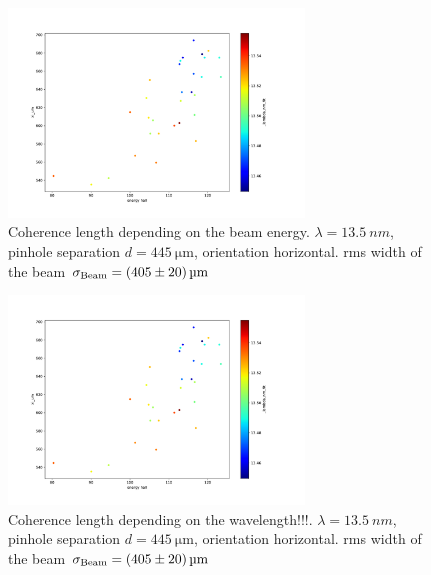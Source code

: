 \documentclass{osa-article}
\begin{document}
\begin{figure}[htbp]
    \centering
    \includegraphics[width=0.7\textwidth]{gfx/13p5nm_S_445um/xi_um_vs_energy_hall_FLASH2_USER1-2017-11-29T1007.pdf}
    \caption{Coherence length depending on the beam energy. $\lambda=\SI{13.5}{nm}$, pinhole separation $d=\SI{445}{\micro\meter}$, orientation horizontal. rms width of the beam $\sigma_{\textup{Beam}} = \SI[separate-uncertainty=true]{405(20)}{\micro\meter}$}
    \label{fig:13p5nm_S_445um_xi_um_vs_energy_hall_FLASH2_USER1-2017-11-29T1007}
\end{figure}

\begin{figure}[htbp]
    \centering
    \includegraphics[width=0.7\textwidth]{gfx/13p5nm_S_445um/xi_um_vs_energy_hall_FLASH2_USER1-2017-11-29T1007.pdf}
    \caption{Coherence length depending on the wavelength!!!. $\lambda=\SI{13.5}{nm}$, pinhole separation $d=\SI{445}{\micro\meter}$, orientation horizontal. rms width of the beam $\sigma_{\textup{Beam}} = \SI[separate-uncertainty=true]{405(20)}{\micro\meter}$}
    \label{fig:13p5nm_S_445um_xi_um_vs_energy_hall_FLASH2_USER1-2017-11-29T1007}
\end{figure}
\end{document}
